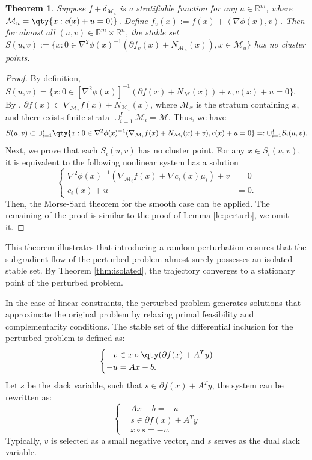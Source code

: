 \documentclass[11pt]{article}
\newcommand{\R}{\mathbb R}
\newcommand{\cM}{\mathcal M}
\def\inner#1{\left\langle#1\right\rangle}
\newtheorem{theorem}{Theorem}[section]
\begin{document}
\begin{theorem}
Suppose $f+\delta_{\cM_u}$ is a stratifiable function for any $u\in\R^m$, where $\cM_u=\qty{x:c(x)+u=0)}$. Define $f_v(x):=f(x)+\inner{\nabla\phi(x),v}$. Then for almost all $(u,v)\in\R^m\times\R^n$, the stable set $S(u,v):=\{x:0\in \nabla^2\phi(x)^{-1} (\partial f_v(x)+N_{\mathcal{M}_u}(x)),x\in\cM_{u}\}$ has no cluster points. 
\end{theorem}
\begin{proof}
By definition, $S(u,v)=\{x:0\in [\nabla^2\phi(x)]^{-1}  (\partial f(x)+N_{\mathcal{M}}(x))+v,c(x)+u=0\}$. By \cite[Proposition 4]{bolte2007clarke}, $\partial f(x)\subset\nabla_{\cM_x}f(x)+N_{\cM_x}(x)$, where $\cM_x$ is the stratum containing $x$, and there exists finite strata $\cup_{i=1}^I\cM_i=\cM$. Thus, we have
\[
S(u,v)\subset\cup_{i=1}^I\qty{x:0\in \nabla^2\phi(x)^{-1}(\nabla_{\cM_i}f(x)+N_{\cM_i}(x)+v),c(x)+u=0}=:\cup_{i=1}^IS_i(u,v).
\]
Next, we prove that each $S_i(u,v)$ has no cluster point. For any $x\in S_i(u,v)$, it is equivalent to the following nonlinear system has a solution
\[
\left\{
\begin{aligned}
\nabla^2\phi(x)^{-1}(\nabla_{\cM_i} f(x)+\nabla c_i(x)\mu_i)+v&=0\\
c_i(x)+u&=0.
\end{aligned}
\right.
\]
Then, the Morse-Sard theorem for the smooth case can be applied. The remaining of the proof is similar to the proof of Lemma \ref{le:perturb}, we omit it.
\end{proof}


This theorem illustrates that introducing a random perturbation ensures that the subgradient flow of the perturbed problem almost surely possesses an isolated stable set. By Theorem \ref{thm:isolated}, the trajectory converges to a stationary point of the perturbed problem.

In the case of linear constraints, the perturbed problem generates solutions that approximate the original problem by relaxing primal feasibility and complementarity conditions. The stable set of the differential inclusion for the perturbed problem is defined as:
\[
\left\{\begin{aligned}
    -v&\in x\circ\qty(\partial f(x)+A^Ty)\\
    -u&=Ax-b.
\end{aligned}\right.
\]
Let $s$ be the slack variable, such that $s\in\partial f(x)+A^Ty$, the system can be rewritten as:
\[
\left\{\begin{aligned}
    &Ax-b=-u\\
    &s\in\partial f(x)+A^Ty\\
    &x\circ s=-v.
\end{aligned}\right.
\]
Typically, $ v $ is selected as a small negative vector, and $ s $ serves as the dual slack variable.
\end{document}
